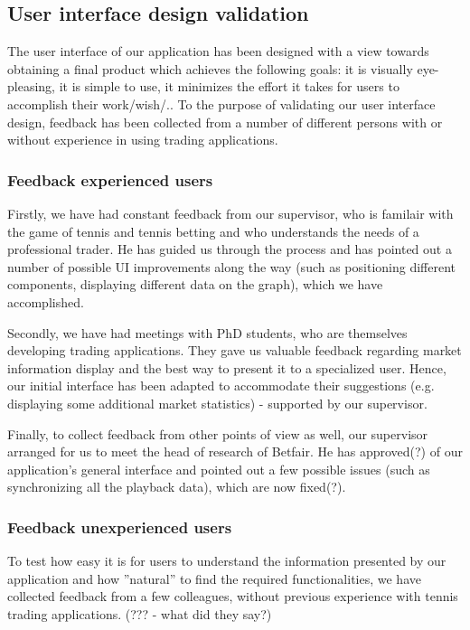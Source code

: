 \documentclass[10pt]{article}
\begin{document}
\subsection{User interface design validation}

The user interface of our application has been designed with a view towards obtaining a final product which achieves the following goals: it is visually eye-pleasing, it is simple to use, it minimizes the effort it takes for users to accomplish their work/wish/..
To the purpose of validating our user interface design, feedback has been collected from a number of different persons with or without experience in using trading applications.

\subsubsection{Feedback experienced users}

Firstly, we have had constant feedback from our supervisor, who is familair with the game of tennis and tennis betting and who understands the needs of a professional trader. He has guided us through the process and has pointed out a number of possible UI improvements along the way (such as positioning different components, displaying different data on the graph), which we have accomplished.

Secondly, we have had meetings with PhD students, who are themselves developing trading applications. They gave us valuable feedback regarding market information display and the best way to present it to a specialized user. Hence, our initial interface has been adapted to accommodate their suggestions (e.g. displaying some additional market statistics) - supported by our supervisor.

Finally, to collect feedback from other points of view as well, our supervisor arranged for us to meet the head of research of Betfair. He has approved(?) of our application's general interface and pointed out a few possible issues (such as synchronizing all the playback data), which are now fixed(?).

\subsubsection{Feedback unexperienced users}

To test how easy it is for users to understand the information presented by our application and how ''natural'' to find the required functionalities, we have collected feedback from a few colleagues, without previous experience with tennis trading applications. (??? - what did they say?)
\end{document}
